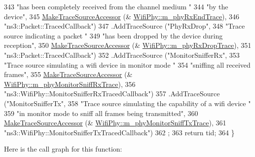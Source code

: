 \begin{DoxyCode}
343                      \textcolor{stringliteral}{"has been completely received from the channel medium "}
344                      \textcolor{stringliteral}{"by the device"},
345                      \hyperlink{group__tracing_gab21a770b9855af4e8f69f7531ea4a6b0}{MakeTraceSourceAccessor} (&
      \hyperlink{classns3_1_1WifiPhy_a49fafa73ef1e41ad7f93e792f523dfdd}{WifiPhy::m\_phyRxEndTrace}),
346                      \textcolor{stringliteral}{"ns3::Packet::TracedCallback"})
347     .AddTraceSource (\textcolor{stringliteral}{"PhyRxDrop"},
348                      \textcolor{stringliteral}{"Trace source indicating a packet "}
349                      \textcolor{stringliteral}{"has been dropped by the device during reception"},
350                      \hyperlink{group__tracing_gab21a770b9855af4e8f69f7531ea4a6b0}{MakeTraceSourceAccessor} (&
      \hyperlink{classns3_1_1WifiPhy_a4ed70c61781e7d5de9ae5bb16c613fb8}{WifiPhy::m\_phyRxDropTrace}),
351                      \textcolor{stringliteral}{"ns3::Packet::TracedCallback"})
352     .AddTraceSource (\textcolor{stringliteral}{"MonitorSnifferRx"},
353                      \textcolor{stringliteral}{"Trace source simulating a wifi device in monitor mode "}
354                      \textcolor{stringliteral}{"sniffing all received frames"},
355                      \hyperlink{group__tracing_gab21a770b9855af4e8f69f7531ea4a6b0}{MakeTraceSourceAccessor} (&
      \hyperlink{classns3_1_1WifiPhy_ae1bb9ca40837a43219f2be0aadbdc02b}{WifiPhy::m\_phyMonitorSniffRxTrace}),
356                      \textcolor{stringliteral}{"ns3::WifiPhy::MonitorSnifferRxTracedCallback"})
357     .AddTraceSource (\textcolor{stringliteral}{"MonitorSnifferTx"},
358                      \textcolor{stringliteral}{"Trace source simulating the capability of a wifi device "}
359                      \textcolor{stringliteral}{"in monitor mode to sniff all frames being transmitted"},
360                      \hyperlink{group__tracing_gab21a770b9855af4e8f69f7531ea4a6b0}{MakeTraceSourceAccessor} (&
      \hyperlink{classns3_1_1WifiPhy_ab11e6362f76c35f9a4c467c6c7765861}{WifiPhy::m\_phyMonitorSniffTxTrace}),
361                      \textcolor{stringliteral}{"ns3::WifiPhy::MonitorSnifferTxTracedCallback"})
362   ;
363   \textcolor{keywordflow}{return} tid;
364 \}
\end{DoxyCode}


Here is the call graph for this function\+:


